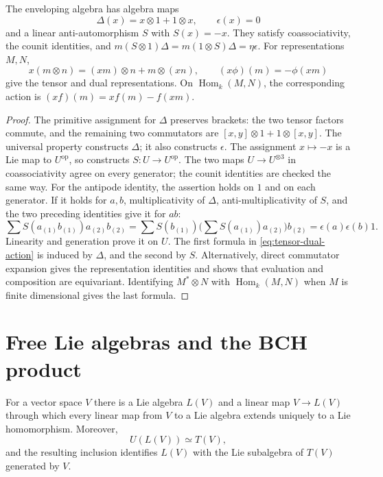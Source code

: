 \begin{proposition}\label{res:A06}
The enveloping algebra has algebra maps
\[
 \Delta(x)=x\otimes1+1\otimes x,\qquad \epsilon(x)=0
\]
and a linear anti-automorphism \(S\) with \(S(x)=-x\).
They satisfy coassociativity, the counit identities, and
\(m(S\otimes1)\Delta=m(1\otimes S)\Delta=\eta\epsilon\).
For representations \(M,N\),
\[
 x(m\otimes n)=(xm)\otimes n+m\otimes(xn),\qquad
 (x\phi)(m)=-\phi(xm)
 \tag{1.3}\label{eq:tensor-dual-action}
\]
give the tensor and dual representations. On
\(\operatorname{Hom}_k(M,N)\), the corresponding action is
\((x f)(m)=x f(m)-f(xm)\).
\end{proposition}

\begin{proof}
The primitive assignment for \(\Delta\) preserves brackets:
the two tensor factors commute, and the remaining two
commutators are \([x,y]\otimes1+1\otimes[x,y]\).
The universal property constructs \(\Delta\); it also constructs
\(\epsilon\). The assignment \(x\mapsto-x\) is a Lie map to
\(U^{\mathrm{op}}\), so constructs \(S:U\to U^{\mathrm{op}}\).
The two maps \(U\to U^{\otimes3}\) in coassociativity agree on
every generator; the counit identities are checked the same way.
For the antipode identity, the assertion holds on \(1\) and on
each generator. If it holds for \(a,b\), multiplicativity of
\(\Delta\), anti-multiplicativity of \(S\), and the two preceding
identities give it for \(ab\):
\[
 \sum S(a_{(1)}b_{(1)})a_{(2)}b_{(2)}
 =\sum S(b_{(1)})\Big(\sum S(a_{(1)})a_{(2)}\Big)b_{(2)}
 =\epsilon(a)\epsilon(b)1.
\]
Linearity and generation prove it on \(U\).
The first formula in \eqref{eq:tensor-dual-action} is induced
by \(\Delta\), and the second by \(S\).
Alternatively, direct commutator expansion gives the
representation identities and shows that evaluation and
composition are equivariant. Identifying \(M^*\otimes N\)
with \(\operatorname{Hom}_k(M,N)\) when \(M\) is finite
dimensional gives the last formula.
\end{proof}

\section{Free Lie algebras and the BCH product}

\begin{theorem}\label{res:A07}
For a vector space \(V\) there is a Lie algebra \(L(V)\) and a
linear map \(V\to L(V)\) through which every linear map from \(V\)
to a Lie algebra extends uniquely to a Lie homomorphism.
Moreover,
\[
 U(L(V))\simeq T(V),
\]
and the resulting inclusion identifies \(L(V)\) with the Lie
subalgebra of \(T(V)\) generated by \(V\).
\end{theorem}

